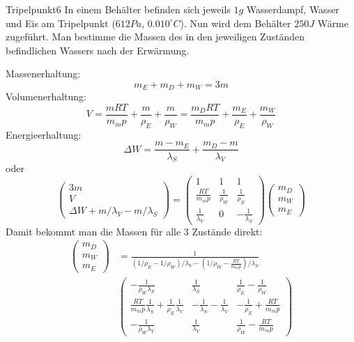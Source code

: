 \begin{problem}{Tripelpunkt}{6}
In einem Behälter befinden sich jeweils $1 \unit{g}$ Wasserdampf, Wasser und Eis am Tripelpunkt ($612 \unit{Pa}$, $0.010^\circ \unit{C}$). Nun wird dem Behälter $250 \unit{J}$ Wärme zugeführt. Man bestimme die Massen des in den jeweiligen Zuständen befindlichen Wassers nach der Erwärmung.
\begin{solution}
Massenerhaltung:\vspace{-1ex}\[
m_E + m_D + m_W = 3m
\]
Volumenerhaltung:\vspace{-1ex}\[
V=\frac{m RT}{m_m p} + \frac{m}{\rho_E} + \frac{m}{\rho_W} = \frac{m_D RT}{m_m p} + \frac{m_E}{\rho_E} + \frac{m_W}{\rho_W}
\]
Energieerhaltung:\vspace{-1ex}\[
\Delta W = \frac{m-m_E}{\lambda_S} + \frac{m_D-m}{\lambda_V}
\]
oder\vspace{-1ex}\[
\begin{pmatrix}
3m \\ V \\ \Delta W + m / \lambda_V - m / \lambda_S
\end{pmatrix}
=
\begin{pmatrix}
1 & 1 & 1 \\
\frac{RT}{m_m p} & \frac{1}{\rho_W} & \frac{1}{\rho_E} \\
\frac{1}{\lambda_V} & 0 & - \frac{1}{\lambda_S}
\end{pmatrix}
\begin{pmatrix}
m_D \\ m_W \\ m_E
\end{pmatrix}
\]
Damit bekommt man die Massen für alle 3 Zustände direkt:
\[
\begin{split}
\begin{pmatrix}
m_D \\ m_W \\ m_E
\end{pmatrix}
&=
\frac{1}{(1/\rho_E - 1/\rho_W) / \lambda_V - (1/\rho_W - \frac{RT}{m_m p}) / \lambda_S}\\
&\begin{pmatrix}
-\frac{1}{\rho_W \lambda_S} & \frac{1}{\lambda_S} & \frac{1}{\rho_E} - \frac{1}{\rho_W} \\
\frac{RT}{m_m p} \frac{1}{\lambda_S}+\frac{1}{\rho_E}\frac{1}{\lambda_V}  & -\frac{1}{\lambda_S}-\frac{1}{\lambda_V} & -\frac{1}{\rho_E}+\frac{RT}{m_m p} \\
-\frac{1}{\rho_W \lambda_V} & \frac{1}{\lambda_V} & \frac{1}{\rho_W}-\frac{RT}{m_m p}

\end{pmatrix}
\end{split}\]
\end{solution}
\end{problem}

